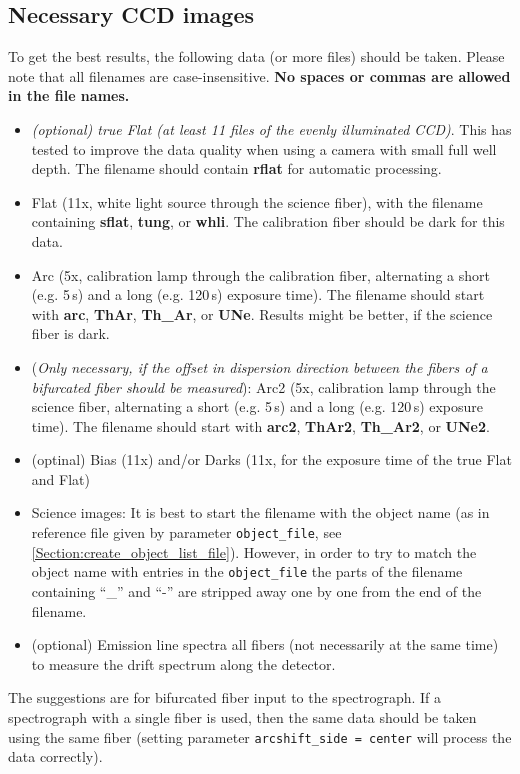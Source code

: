 \documentclass[10pt,a4paper]{article}
\begin{document}
\subsection{Necessary CCD images}

To get the best results, the following data (or more files) should be taken. Please note that all filenames are case-insensitive. \textbf{No spaces or commas are allowed in the file names.}
\begin{itemize}
  \item \textit{(optional) true Flat (at least 11 files of the evenly illuminated CCD)}. This has tested to improve the data quality when using a camera with small full well depth. The filename should contain \textbf{rflat} for automatic processing.
  \item Flat (11x, white light source through the science fiber), with the filename containing \textbf{sflat}, \textbf{tung}, or \textbf{whli}. The calibration fiber should be dark for this data.
  \item Arc (5x, calibration lamp through the calibration fiber, alternating a short (e.g. 5\,s) and a long (e.g. 120\,s) exposure time). The filename should start with \textbf{arc}, \textbf{ThAr}, \textbf{Th\_Ar}, or \textbf{UNe}. Results might be better, if the science fiber is dark.
  \item (\textit{Only necessary, if the offset in dispersion direction between the fibers of a bifurcated fiber should be measured}): Arc2 (5x, calibration lamp through the science fiber, alternating a short (e.g. 5\,s) and a long (e.g. 120\,s) exposure time). The filename should start with \textbf{arc2}, \textbf{ThAr2}, \textbf{Th\_Ar2}, or \textbf{UNe2}.
  \item (optinal) Bias (11x) and/or Darks (11x, for the exposure time of the true Flat and Flat)%
  \item Science images: It is best to start the filename with the object name (as in reference file given by parameter \verb|object_file|, see \ref{Section:create_object_list_file}). However, in order to try to match the object name with entries in the \verb|object_file| the parts of the filename containing ``\_'' and ``-'' are stripped away one by one from the end of the filename.
  \item (optional) Emission line spectra all fibers (not necessarily at the same time) to measure the drift spectrum along the detector.
\end{itemize}
The suggestions are for bifurcated fiber input to the spectrograph. If a spectrograph with a single fiber is used, then the same data should be taken using the same fiber (setting parameter \verb|arcshift_side = center| will process the data correctly).
\end{document}
